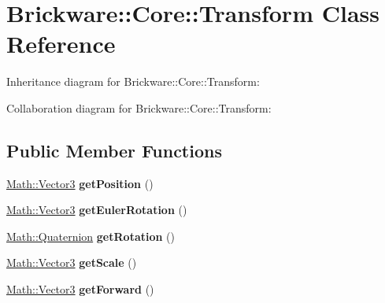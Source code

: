\hypertarget{classBrickware_1_1Core_1_1Transform}{}\section{Brickware\+:\+:Core\+:\+:Transform Class Reference}
\label{classBrickware_1_1Core_1_1Transform}


Inheritance diagram for Brickware\+:\+:Core\+:\+:Transform\+:


Collaboration diagram for Brickware\+:\+:Core\+:\+:Transform\+:
\subsection*{Public Member Functions}
\begin{DoxyCompactItemize}
\item 
\hypertarget{classBrickware_1_1Core_1_1Transform_a54603e624119dae700a9b31bb5da5fb0}{}\hyperlink{classBrickware_1_1Math_1_1Vector3}{Math\+::\+Vector3} {\bfseries get\+Position} ()\label{classBrickware_1_1Core_1_1Transform_a54603e624119dae700a9b31bb5da5fb0}

\item 
\hypertarget{classBrickware_1_1Core_1_1Transform_a191e77cd43648be72b32e5914137953f}{}\hyperlink{classBrickware_1_1Math_1_1Vector3}{Math\+::\+Vector3} {\bfseries get\+Euler\+Rotation} ()\label{classBrickware_1_1Core_1_1Transform_a191e77cd43648be72b32e5914137953f}

\item 
\hypertarget{classBrickware_1_1Core_1_1Transform_ae26f9ea51e7728db99a03722393fab6e}{}\hyperlink{classBrickware_1_1Math_1_1Quaternion}{Math\+::\+Quaternion} {\bfseries get\+Rotation} ()\label{classBrickware_1_1Core_1_1Transform_ae26f9ea51e7728db99a03722393fab6e}

\item 
\hypertarget{classBrickware_1_1Core_1_1Transform_ada0f854cc35f0c2410a936599c55a571}{}\hyperlink{classBrickware_1_1Math_1_1Vector3}{Math\+::\+Vector3} {\bfseries get\+Scale} ()\label{classBrickware_1_1Core_1_1Transform_ada0f854cc35f0c2410a936599c55a571}

\item 
\hypertarget{classBrickware_1_1Core_1_1Transform_a5cfba92eb7a95f4901e3cea20e819992}{}\hyperlink{classBrickware_1_1Math_1_1Vector3}{Math\+::\+Vector3} {\bfseries get\+Forward} ()\label{classBrickware_1_1Core_1_1Transform_a5cfba92eb7a95f4901e3cea20e819992}


\end{DoxyCompactItemize}
